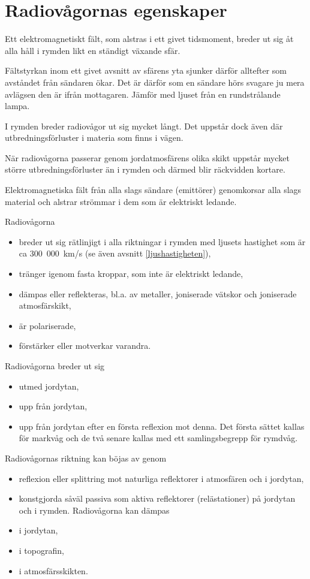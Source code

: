 \section{Radiovågornas egenskaper}
\label{radiovågornasegenskaper}

Ett elektromagnetiskt fält, som alstras i ett givet tidsmoment, breder
ut sig åt alla håll i rymden likt en ständigt växande sfär.

Fältstyrkan inom ett givet avsnitt av sfärens yta sjunker därför
alltefter som avståndet från sändaren ökar. Det är därför som en
sändare hörs svagare ju mera avlägsen den är ifrån mottagaren. Jämför
med ljuset från en rundstrålande lampa.

I rymden breder radiovågor ut sig mycket långt. Det uppstår dock även
där utbredningsförluster i materia som finns i vägen.

När radiovågorna passerar genom jordatmosfärens olika skikt uppstår
mycket större utbredningsförluster än i rymden och därmed blir
räckvidden kortare.

Elektromagnetiska fält från alla slags sändare (emittörer) genomkorsar
alla slags material och alstrar strömmar i dem som är elektriskt
ledande.

Radiovågorna
\begin{itemize}
\item breder ut sig rätlinjigt i alla riktningar i rymden med ljusets
  hastighet som är ca 300~000~km/s (se även avsnitt \ref{ljushastigheten}),
\item tränger igenom fasta kroppar, som inte är elektriskt ledande,
\item dämpas eller reflekteras, bl.a. av metaller, joniserade vätskor
  och joniserade atmosfärskikt,
\item är polariserade,
\item förstärker eller motverkar varandra.
\end{itemize}
Radiovågorna breder ut sig
\begin{itemize}
\item utmed jordytan,
\item upp från jordytan,
\item upp från jordytan efter en första reflexion mot denna.  Det
  första sättet kallas för markvåg och de två senare kallas med ett
  samlingsbegrepp för rymdvåg.
\end{itemize}

Radiovågornas riktning kan böjas av genom
\begin{itemize}
\item reflexion eller splittring mot naturliga reflektorer i
  atmosfären och i jordytan,
\item konstgjorda såväl passiva som aktiva reflektorer (relästationer)
  på jordytan och i rymden.  Radiovågorna kan dämpas
\item i jordytan,
\item i topografin,
\item i atmosfärsskikten.
\end{itemize}

